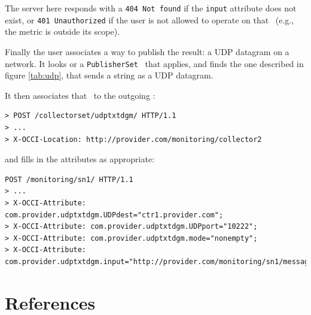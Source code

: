 \documentclass[12pt]{article}  %
\begin{document}
The server here responds with a {\tt 404 Not found} if the {\tt input} attribute does not exist, or {\tt 401 Unauthorized} if the user is not allowed to operate on that \rs\ (e.g., the metric is outside its scope).

Finally the user associates a way to publish the result: a UDP datagram on a network. It looks or a {\tt PublisherSet} \mi\ that applies, and finds the one described in figure \ref{tab:udp}, that sends a string as a UDP datagram.

\begin{table}
\scriptsize
{}

\caption{Attributes defined for the {\tt udptxtdgm} mixin \label{tab:udp}}
\end {table}

It then associates that \mi\ to the outgoing \coll:

\begin{verbatim}
> POST /collectorset/udptxtdgm/ HTTP/1.1
> ...
> X-OCCI-Location: http://provider.com/monitoring/collector2
\end{verbatim}

and fills in the attributes as appropriate:

\begin{verbatim}
POST /monitoring/sn1/ HTTP/1.1
> ...
> X-OCCI-Attribute: com.provider.udptxtdgm.UDPdest="ctr1.provider.com";
> X-OCCI-Attribute: com.provider.udptxtdgm.UDPport="10222";
> X-OCCI-Attribute: com.provider.udptxtdgm.mode="nonempty";
> X-OCCI-Attribute: com.provider.udptxtdgm.input="http://provider.com/monitoring/sn1/message";
\end{verbatim}




\section{References}
\end{document}
